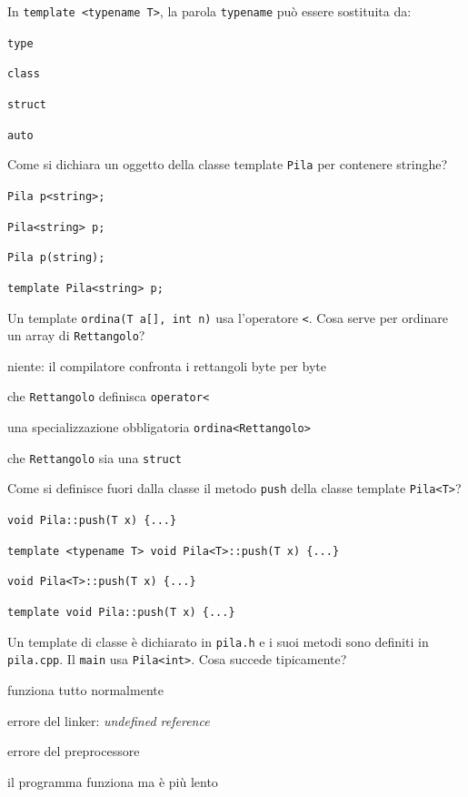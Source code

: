 \begin{quiz}{In \texttt{template <typename T>}, la parola \texttt{typename} può essere sostituita da:}
  \item \texttt{type}
  \item \texttt{class}
  \item \texttt{struct}
  \item \texttt{auto}
\end{quiz}

\begin{quiz}{Come si dichiara un oggetto della classe template \texttt{Pila} per contenere stringhe?}
  \item \texttt{Pila p<string>;}
  \item \texttt{Pila<string> p;}
  \item \texttt{Pila p(string);}
  \item \texttt{template Pila<string> p;}
\end{quiz}

\begin{quiz}{Un template \texttt{ordina(T a[], int n)} usa l'operatore \texttt{<}. Cosa serve per ordinare un array di \texttt{Rettangolo}?}
  \item niente: il compilatore confronta i rettangoli byte per byte
  \item che \texttt{Rettangolo} definisca \texttt{operator<}
  \item una specializzazione obbligatoria \texttt{ordina<Rettangolo>}
  \item che \texttt{Rettangolo} sia una \texttt{struct}
\end{quiz}

\begin{quiz}{Come si definisce fuori dalla classe il metodo \texttt{push} della classe template \texttt{Pila<T>}?}
  \item \texttt{void Pila::push(T x) \{...\}}
  \item \texttt{template <typename T> void Pila<T>::push(T x) \{...\}}
  \item \texttt{void Pila<T>::push(T x) \{...\}}
  \item \texttt{template void Pila::push(T x) \{...\}}
\end{quiz}

\begin{quiz}{Un template di classe è dichiarato in \texttt{pila.h} e i suoi metodi sono definiti in \texttt{pila.cpp}. Il \texttt{main} usa \texttt{Pila<int>}. Cosa succede tipicamente?}
  \item funziona tutto normalmente
  \item errore del linker: \emph{undefined reference}
  \item errore del preprocessore
  \item il programma funziona ma è più lento
\end{quiz}

